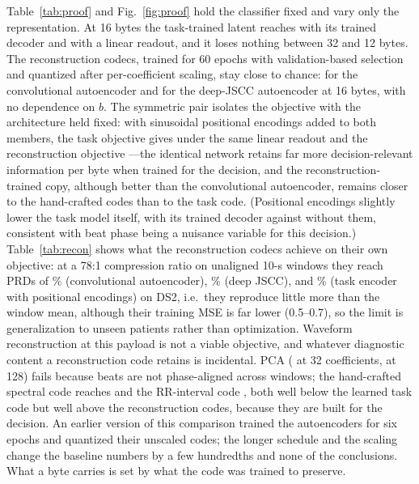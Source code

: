 \documentclass[journal]{IEEEtran}
\begin{document}
Table~\ref{tab:proof} and Fig.~\ref{fig:proof} hold the classifier fixed and vary only the representation. At 16 bytes the task-trained latent reaches \taskNativeSixteen{} with its trained decoder and \taskLogregSixteen{} with a linear readout, and it loses nothing between 32 and 12 bytes. The reconstruction codecs, trained for 60 epochs with validation-based selection and quantized after per-coefficient scaling, stay close to chance: \convaeSixteen{} for the convolutional autoencoder and \jsccSixteen{} for the deep-JSCC autoencoder at 16 bytes, with no dependence on $b$. \ifhavepe The symmetric pair isolates the objective with the architecture held fixed: with sinusoidal positional encodings added to both members, the task objective gives \taskPeSixteen{} under the same linear readout and the reconstruction objective \sameencSixteen{}---the identical network retains far more decision-relevant information per byte when trained for the decision, and the reconstruction-trained copy, although better than the convolutional autoencoder, remains closer to the hand-crafted codes than to the task code. (Positional encodings slightly lower the task model itself, \mainPeAUROC{} with its trained decoder against \mainAUROC{} without them, consistent with beat phase being a nuisance variable for this decision.) \fi Table~\ref{tab:recon} shows what the reconstruction codecs achieve on their own objective: at a 78:1 compression ratio on unaligned 10-s windows they reach PRDs of \convaePRD{}\% (convolutional autoencoder), \jsccPRD{}\% (deep JSCC)\ifhavepe, and \sameencPRD{}\% (task encoder with positional encodings)\fi{} on DS2, i.e.\ they reproduce little more than the window mean, although their training MSE is far lower (0.5--0.7), so the limit is generalization to unseen patients rather than optimization. Waveform reconstruction at this payload is not a viable objective, and whatever diagnostic content a reconstruction code retains is incidental. PCA (\pcaThirtyTwo{} at 32 coefficients, \pcaOneTwentyEight{} at 128) fails because beats are not phase-aligned across windows; the hand-crafted spectral code reaches \summaryProof{} and the RR-interval code \rrProof{}, both well below the learned task code but well above the reconstruction codes, because they are built for the decision. An earlier version of this comparison trained the autoencoders for six epochs and quantized their unscaled codes; the longer schedule and the scaling change the baseline numbers by a few hundredths and none of the conclusions. What a byte carries is set by what the code was trained to preserve.
\end{document}
